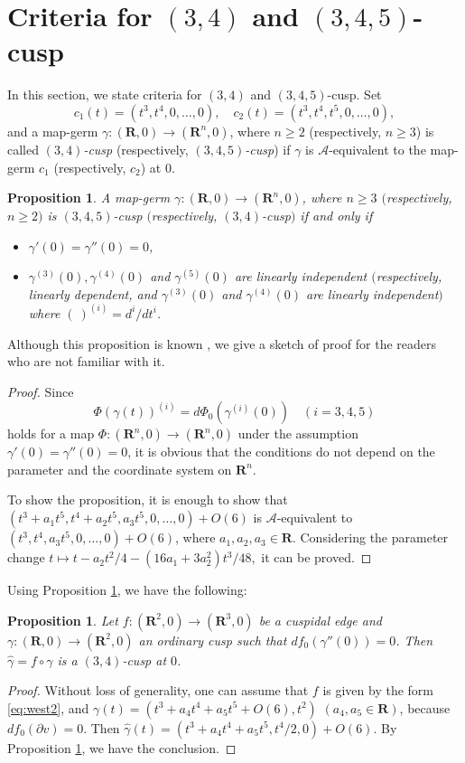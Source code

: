 \documentclass[a4paper, 12pt]{article}
\newtheorem{proposition}[theorem]{Proposition}
\theoremstyle{definition}
\numberwithin{equation}{section}
\begin{document}
\section{Criteria for $(3,4)$ and $(3,4,5)$-cusp}
\label{sec:cri}
In this section, we state criteria for
$(3,4)$ and $(3,4,5)$-cusp.
Set
$$
c_1(t)=(t^3,t^4,0,\ldots,0),\quad
c_2(t)=(t^3,t^4,t^5,0,\ldots,0),
$$
and a map-germ
$\gamma:({\boldsymbol{R}},0)\to({\boldsymbol{R}}^n,0)$, where $n\geq2$ (respectively, $n\geq 3$)
is called {\it $(3,4)$-cusp}\/ (respectively, {\it $(3,4,5)$-cusp}\/)
if $\gamma$ is ${\mathcal{A}}$-equivalent to the map-germ 
$c_1$ (respectively, $c_2$) at $0$.
\begin{proposition}\label{prop:cri}
A map-germ\/
$\gamma:({\boldsymbol{R}},0)\to({\boldsymbol{R}}^n,0)$, where\/ $n\geq3$ $($respectively, $n\geq 2)$
is\/ $(3,4,5)$-cusp\/ $($respectively, $(3,4)$-cusp\/$)$
if and only if
\begin{itemize}
\item[{\rm (i)}]\label{itm:cusp1} 
$\gamma'(0)=\gamma''(0)=0$,
\item[{\rm (ii)}]\label{itm:cusp2} 
$\gamma^{(3)}(0),\gamma^{(4)}(0)$ and\/ $\gamma^{(5)}(0)$
are linearly independent
$($respectively, linearly dependent, and\/
$\gamma^{(3)}(0)$ and\/ $\gamma^{(4)}(0)$ 
are linearly independent\/$)$
where\/
$(~)^{(i)}=d^i/dt^i$.
\end{itemize}
\end{proposition}
Although this proposition is known \cite{bg,gh},
we give a sketch of proof for the readers who are not
familiar with it.
\begin{proof}
Since
$$
\Phi(\gamma(t))^{(i)}=d\Phi_0(\gamma^{(i)}(0))
\quad (i=3,4,5)
$$
holds for a map $\Phi:({\boldsymbol{R}}^n,0)\to({\boldsymbol{R}}^n,0)$
under the assumption $\gamma'(0)=\gamma''(0)=0$,
it is obvious that the conditions do not depend on
the parameter and the coordinate system on ${\boldsymbol{R}}^n$.

To show the 
proposition,
it is enough to show that
$(t^3+a_1t^5,t^4+a_2t^5,a_3t^5,0,\ldots,0)+O(6)$
is ${\mathcal{A}}$-equivalent to
$(t^3,t^4,a_3t^5,0,\ldots,0)+O(6)$,
where $a_1,a_2,a_3\in{\boldsymbol{R}}$.
Considering the parameter change
$
t\mapsto
t-a_2t^2/4-(16 a_1 + 3 a_2^2)t^3/48,
$
it can be proved.
\end{proof}
Using Proposition \ref{prop:cri}, we have the following:
\begin{proposition}
Let\/ $f:({\boldsymbol{R}}^2,0)\to({\boldsymbol{R}}^3,0)$ be a cuspidal edge and\/
$\gamma:({\boldsymbol{R}},0)\to({\boldsymbol{R}}^2,0)$ an ordinary cusp such that\/
$df_0(\gamma''(0))=0$.
Then\/ $\hat\gamma=f\circ \gamma$ is a\/ $(3,4)$-cusp
at\/ $0$.
\end{proposition}
\begin{proof}
Without loss of generality, one can assume that
$f$ is given by the form \eqref{eq:west2},
and $\gamma(t)=(t^3+a_4t^4+a_5t^5+O(6),t^2)$ $(a_4,a_5\in{\boldsymbol{R}})$, 
because $df_0(\partial v)=0$.
Then $\hat\gamma(t)=(t^3+a_4t^4+a_5t^5,t^4/2,0)+O(6)$.
By Proposition \ref{prop:cri}, we have the conclusion.
\end{proof}
\end{document}
